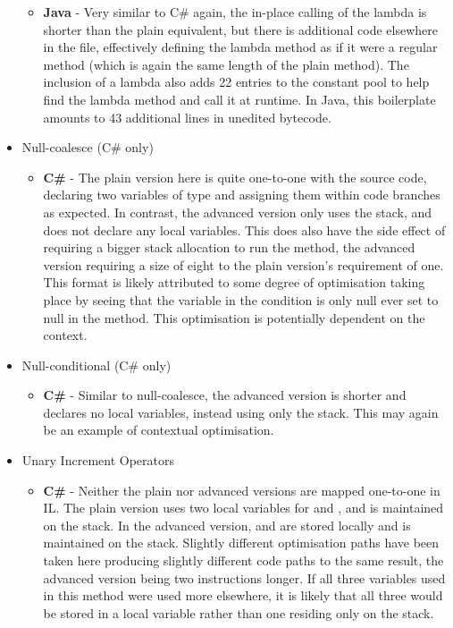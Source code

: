 \documentclass{article}
\begin{document}
\begin{itemize}
\begin{itemize}
                \item \textbf{Java} - Very similar to C\# again, the in-place calling of the lambda is shorter than the plain equivalent, but there is additional code elsewhere in the file, effectively defining the lambda method as if it were a regular method (which is again the same length of the plain method). The inclusion of a lambda also adds 22 entries to the constant pool to help find the lambda method and call it at runtime. In Java, this boilerplate amounts to 43 additional lines in unedited bytecode.
            \end{itemize}
            \item Null-coalesce (C\# only)
            \begin{itemize}
                \item \textbf{C\#} - The plain version here is quite one-to-one with the source code, declaring two variables of type  and assigning them within code branches as expected. In contrast, the advanced version only uses the stack, and does not declare any local variables. This does also have the side effect of requiring a bigger stack allocation to run the method, the advanced version requiring a size of eight to the plain version's requirement of one. This format is likely attributed to some degree of optimisation taking place by seeing that the variable in the condition is only null ever set to null in the method. This optimisation is potentially dependent on the context.
            \end{itemize}
            \item Null-conditional (C\# only)
            \begin{itemize}
                \item \textbf{C\#} - Similar to null-coalesce, the advanced version is shorter and declares no local variables, instead using only the stack. This may again be an example of contextual optimisation.
            \end{itemize}
            \item Unary Increment Operators
            \begin{itemize}
                \item \textbf{C\#} - Neither the plain nor advanced versions are mapped one-to-one in IL. The plain version uses two local variables for  and , and  is maintained on the stack. In the advanced version,  and  are stored locally and  is maintained on the stack. Slightly different optimisation paths have been taken here producing slightly different code paths to the same result, the advanced version being two instructions longer. If all three variables used in this method were used more elsewhere, it is likely that all three would be stored in a local variable rather than one residing only on the stack.

\end{itemize}
\end{itemize}
\end{document}
